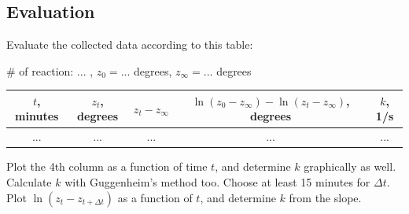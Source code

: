\subsection{Evaluation}
Evaluate the collected data according to this table:

\begin{center}
\# of reaction: ... , $z_0 = ...$ degrees, $z_\infty = ... $ degrees
\begin{tabular}{|c|c|c|c|c|}
\hline
$t$, minutes & $z_t$, degrees & $z_t - z_\infty$ & $\ln(z_0-z_\infty)- \ln(z_t-z_\infty)$, degrees & $k$, 1/s \\
\hline
... & ... & ... & ... & ... \\
\end{tabular}
\end{center}

Plot the 4th column as a function of time $t$, and determine $k$ graphically as well.
Calculate $k$ with Guggenheim's method too. Choose at least 15 minutes for $\Delta t$. 
Plot $\ln (z_t - z_{t+\Delta t})$ as a function of $t$, and determine $k$ from the slope.

